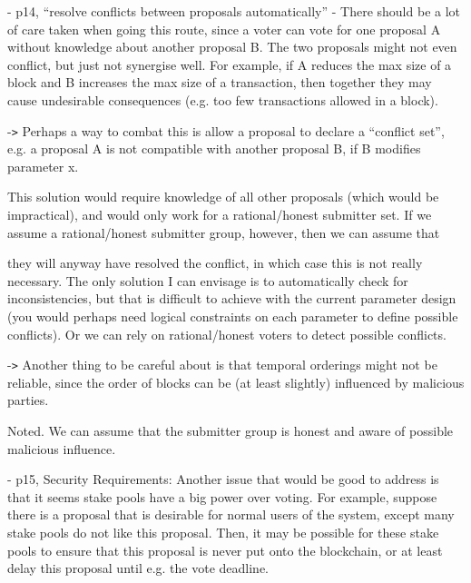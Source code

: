 \documentclass{article}
\begin{document}
\vspace{12pt}
\baselineskip=12pt
\leftskip=0pt
- p14, ``resolve conflicts between proposals automatically'' - There should be 
a lot of care taken when going this route, since a voter can vote for one proposal 
A without knowledge about another proposal B. The two proposals might not even 
conflict, but just not synergise well. For example, if A reduces the max size of 
a block and B increases the max size of a transaction, then together they may cause 
undesirable consequences (e.g. too few transactions allowed in a block).

\parindent=18pt
-\texttt{>} Perhaps a way to combat this is allow a proposal to declare a ``conflict 
set'', e.g. a proposal A is not compatible with another proposal B, if B modifies 
parameter x. 

\vspace{12pt}
\parindent=0pt
{\color{color02} This solution would require knowledge of all other proposals (which 
would be impractical), and would only work for a rational/honest submitter set. 
 If we assume a rational/honest submitter group, however, then we can assume that}

{\color{color02} they will anyway have resolved the conflict, in which case this 
is not really necessary.  The only solution I can envisage is to automatically 
check for inconsistencies, but that is difficult to achieve with the current parameter 
design (you would perhaps need logical constraints on each parameter to define 
possible conflicts).  Or we can rely on rational/honest voters to detect possible 
conflicts.}

\vspace{12pt}
\parindent=18pt
-\texttt{>} Another thing to be careful about is that temporal orderings might 
not be reliable, since the order of blocks can be (at least slightly) influenced 
by malicious parties.

\vspace{12pt}
\parindent=0pt
{\color{color02} Noted.  We can assume that the submitter group is honest and aware 
of possible malicious influence.}

\vspace{12pt}
- p15, Security Requirements: Another issue that would be good to address is that 
it seems stake pools have a big power over voting. For example, suppose there is 
a proposal that is desirable for normal users of the system, except many stake 
pools do not like this proposal. Then, it may be possible for these stake pools 
to ensure that this proposal is never put onto the blockchain, or at least delay 
this proposal until e.g. the vote deadline. 
\end{document}
